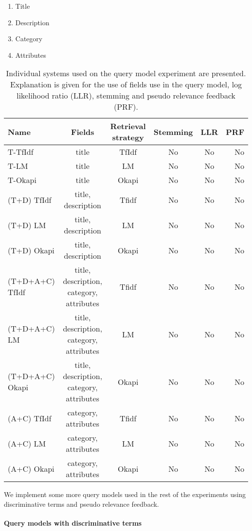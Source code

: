 \begin{enumerate}
\item Title
\item Description
\item Category
\item Attributes
\end{enumerate}
\bigskip

\begin{table}[H]
\begin{center}
\scriptsize
\caption{Individual systems used on the query model experiment are presented. Explanation is given for the use of fields use in the query model, log likelihood ratio (LLR), stemming and pseudo relevance feedback (PRF).}
\begin{tabular}{lccccr}
\midrule
Name & Fields & Retrieval strategy & Stemming & LLR & PRF \\
\midrule
T-TfIdf & title & TfIdf & No & No & No \\
T-LM & title & LM & No & No & No \\
T-Okapi & title & Okapi & No & No & No \\
(T+D) TfIdf & title, description & Tfidf & No & No & No \\
(T+D) LM & title, description & LM & No & No & No \\
(T+D) Okapi & title, description & Okapi & No & No & No \\
(T+D+A+C) TfIdf & title, description, category, attributes & Tfidf & No & No & No \\
(T+D+A+C) LM & title, description, category, attributes & LM & No & No & No \\
(T+D+A+C) Okapi & title, description, category, attributes & Okapi & No & No & No \\
(A+C) TfIdf & category, attributes & Tfidf & No & No & No \\
(A+C) LM & category, attributes & LM & No & No & No \\
(A+C) Okapi & category, attributes & Okapi & No & No & No \\
\bottomrule
\end{tabular}
\end{center}
\end{table}



We implement some more query models used in the rest of the experiments using discriminative terms and pseudo relevance feedback.

 \paragraph{Query models with discriminative terms}

